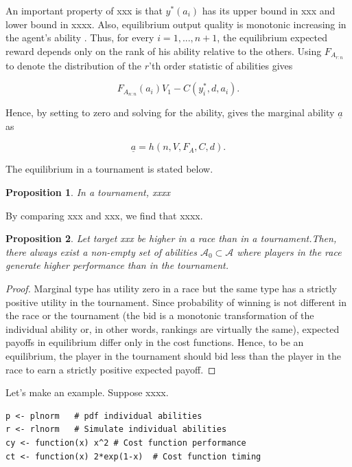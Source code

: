 \documentclass[12pt,]{article}
\newtheorem{proposition}{Proposition}
\begin{document}
An important property of xxx is that \(y^*(a_i)\) has its upper bound in
xxx and lower bound in xxxx. Also, equilibrium output quality is
monotonic increasing in the agent's ability
\citep[see][]{moldovanu2001optimal}. Thus, for every \(i=1, ..., n+1\),
the equilibrium expected reward depends only on the rank of his ability
relative to the others. Using \({F_{A_{r:n}}}\) to denote the
distribution of the \(r\)'th order statistic of abilities gives

\begin{equation} \label{equilibrium payoffs tournament}
  {F_{A_{n:n}}}(a_i) V_1  - C(y_i^*, d, a_i).
\end{equation}

Hence, by setting to zero and solving for the ability, gives the
marginal ability \({\underline a}\) as

\begin{equation}
  {\underline a}= h(n, V, F_A, C, d).
\end{equation}

The equilibrium in a tournament is stated below.

\begin{proposition}
  In a tournament, xxxx 
\end{proposition}

By comparing xxx and xxx, we find that xxxx.

\begin{proposition}
Let target xxx be higher in a race than in a tournament.Then, there always exist a non-empty set of abilities $\mathcal A_0 \subset \mathcal A$ where players in the race generate higher performance than in the tournament.  
\end{proposition}

\begin{proof}
Marginal type has utility zero in a race but the same type has a strictly positive utility in the tournament. Since probability of winning is not different in the race or the tournament (the bid is a monotonic transformation of the individual ability or, in other words, rankings are virtually the same), expected payoffs in equilibrium differ only in the cost functions. Hence, to be an equilibrium, the player in the tournament should bid less than the player in the race to earn a strictly positive expected payoff. 
\end{proof}

Let's make an example. Suppose xxxx.

\begin{verbatim}
p <- plnorm   # pdf individual abilities 
r <- rlnorm   # Simulate individual abilities
cy <- function(x) x^2 # Cost function performance
ct <- function(x) 2*exp(1-x)  # Cost function timing 
\end{verbatim}
\end{document}
